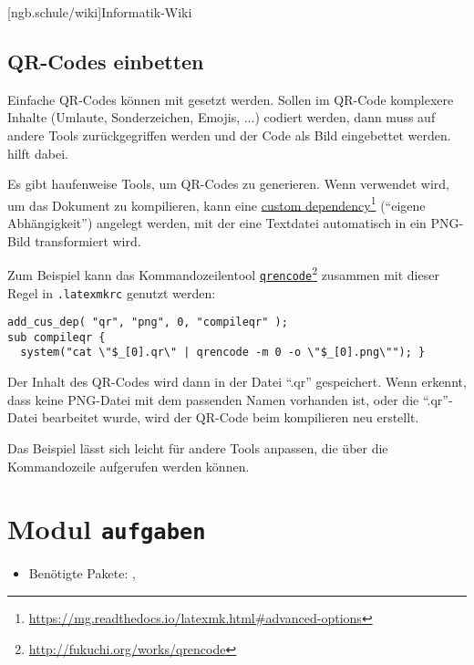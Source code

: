 \begin{example}
\end{example}
\begin{example}
	[ngb.schule/wiki]{Informatik-Wiki}
\end{example}

\subsection{QR-Codes einbetten}\label{subsec:qrcodes-einbetten}

Einfache QR-Codes können mit  gesetzt werden. Sollen im QR-Code
komplexere Inhalte (Umlaute, Sonderzeichen, Emojis, ...) codiert werden, dann
muss auf andere Tools zurückgegriffen werden und der Code als Bild eingebettet
werden.  hilft dabei.

Es gibt haufenweise Tools, um QR-Codes zu generieren. Wenn 
verwendet wird, um das Dokument zu kompilieren, kann eine
\href{https://mg.readthedocs.io/latexmk.html#advanced-options}{custom dependency}\footnote{\url{https://mg.readthedocs.io/latexmk.html\#advanced-options}}
(\enquote{eigene Abhängigkeit}) angelegt werden, mit der eine Textdatei automatisch
in ein PNG-Bild transformiert wird.

Zum Beispiel kann das Kommandozeilentool \href{http://fukuchi.org/works/qrencode}{\texttt{qrencode}}\footnote{\url{http://fukuchi.org/works/qrencode}}
zusammen mit dieser Regel in \texttt{.latexmkrc} genutzt werden:

\begin{verbatim}
add_cus_dep( "qr", "png", 0, "compileqr" );
sub compileqr {
  system("cat \"$_[0].qr\" | qrencode -m 0 -o \"$_[0].png\""); }
\end{verbatim}

Der Inhalt des QR-Codes wird dann in der Datei \enquote{.qr} gespeichert.
Wenn  erkennt, dass keine PNG-Datei mit dem passenden Namen
vorhanden ist, oder die \enquote{.qr}-Datei bearbeitet wurde, wird der
QR-Code beim kompilieren neu erstellt.

Das Beispiel lässt sich leicht für andere Tools anpassen, die über die Kommandozeile
aufgerufen werden können.

\section{Modul \texttt{aufgaben}}\label{sec:modul-aufgaben}
\begin{itemize}
	\item Benötigte Pakete: , 
\end{itemize}

